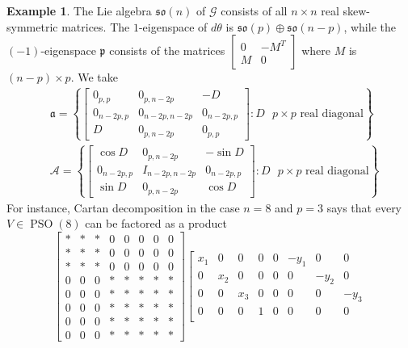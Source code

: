 \documentclass[reqno]{amsart}
\theoremstyle{definition} \newtheorem{example}[theorem]{Example}
\newcommand{\PSO}{\operatorname{PSO}}
\newcommand{\so}{\mathfrak{so}}
\newcommand{\p}{\mathfrak{p}}
\newcommand{\G}{\mathcal{G}}
\newcommand{\A}{\mathcal{A}}
\renewcommand{\a}{\mathfrak{a}}
\begin{document}
\begin{example}
The Lie algebra $\so(n)$ of $\G$ consists of all $n \times n$ real skew-symmetric matrices. The $1$-eigenspace of $d\theta$ is $\so(p) \oplus \so(n-p)$, while the $(-1)$-eigenspace $\p$ consists of the matrices $\left[ \begin{smallmatrix} 0 & -M^T \\ M & 0 \end{smallmatrix}\right]$ where $M$ is $(n-p) \times p$. We take
\begin{align*}
&\a = \left\{ \begin{bmatrix}
0_{p,p} & 0_{p,n-2p} & -D\\
0_{n-2p,p} & 0_{n-2p,n-2p} & 0_{n-2p,p}\\
D & 0_{p,n-2p} & 0_{p,p}
\end{bmatrix} : \text{$D$ $p \times p$ real diagonal} \right\}\\
&\A = \left\{ \begin{bmatrix}
\cos D & 0_{p,n-2p} & -\sin D\\
0_{n-2p,p} & I_{n-2p,n-2p} & 0_{n-2p,p}\\
\sin D & 0_{p,n-2p} & \cos D
\end{bmatrix} : \text{$D$ $p \times p$ real diagonal} \right\} 
\end{align*}
For instance, Cartan decomposition in the case $n = 8$ and $p = 3$ says that every $V \in \PSO(8)$ can be factored as a product
\begin{equation*}
\left[\begin{smallmatrix}
\ast & \ast & \ast & 0 & 0 & 0 & 0 & 0\\
\ast & \ast & \ast & 0 & 0 & 0 & 0 & 0\\
\ast & \ast & \ast & 0 & 0 & 0 & 0 & 0\\
0 & 0 & 0 & \ast & \ast & \ast & \ast & \ast\\
0 & 0 & 0 & \ast & \ast & \ast & \ast & \ast\\
0 & 0 & 0 & \ast & \ast & \ast & \ast & \ast\\
0 & 0 & 0 & \ast & \ast & \ast & \ast & \ast\\
0 & 0 & 0 & \ast & \ast & \ast & \ast & \ast
\end{smallmatrix}\right]
\left[\begin{smallmatrix}
x_1 & 0 & 0 & 0 & 0 & -y_1 & 0 & 0\\
0 & x_2 & 0 & 0 & 0 & 0 & -y_2 & 0\\
0 & 0 & x_3 & 0 & 0 & 0 & 0 & -y_3\\
0 & 0 & 0 & 1 & 0 & 0 & 0 & 0\\

\end{smallmatrix}
\end{equation*}
\end{example}
\end{document}
